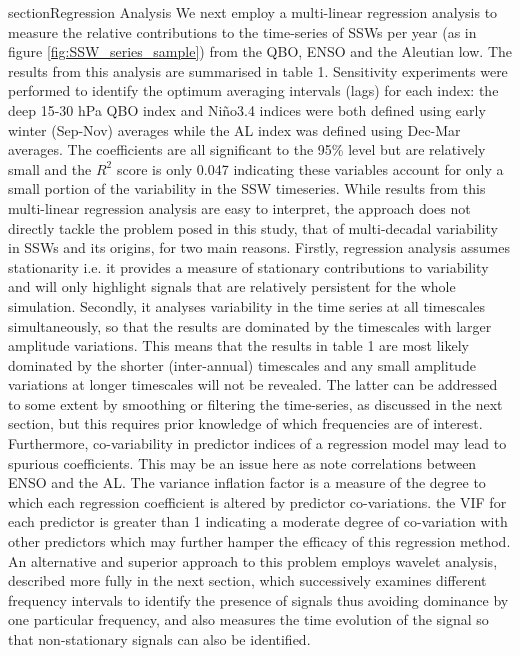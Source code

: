 section{Regression Analysis}
We next employ a multi-linear regression analysis to measure the relative contributions to the time-series of SSWs per year (as in figure \ref{fig:SSW_series_sample}) from the QBO, ENSO and the Aleutian low. The results from this analysis are summarised in table 1.  Sensitivity experiments were performed to identify the optimum averaging intervals (lags) for each index: the deep 15-30 hPa QBO index and Ni\~{n}o3.4 indices were both defined using early winter (Sep-Nov) averages while the AL index was defined using Dec-Mar averages. The coefficients are all significant to the 95\% level but are relatively small and the $R^2$ score is only 0.047 indicating these variables account for only a small portion of the variability in the SSW timeseries. While results from this multi-linear regression analysis are easy to interpret, the approach does not directly tackle the problem posed in this study, that of multi-decadal variability in SSWs and its origins, for two main reasons. Firstly, regression analysis assumes stationarity i.e. it provides a measure of stationary contributions to variability and will only highlight signals that are relatively persistent for the whole simulation. Secondly, it  analyses variability in the time series at all timescales simultaneously, so that the results are dominated by the timescales with larger amplitude variations.  This means that the results in table 1 are most likely dominated by the shorter (inter-annual) timescales and any small amplitude variations at longer timescales will not be revealed. The latter can be addressed to some extent by smoothing or filtering the time-series, as discussed in the next section, but this requires prior knowledge of which frequencies are of interest. Furthermore, co-variability in predictor indices of a regression model may lead to spurious coefficients. This may be an issue here as \cite{raoModulation2019} note correlations between ENSO and the AL. The variance inflation factor is a measure of the degree to which each regression coefficient is altered by predictor co-variations. the VIF for each predictor is greater than 1 indicating a moderate degree of co-variation with other predictors \citep{akinwandeVariance2015} which may further hamper the efficacy of this regression method. An alternative and superior approach to this problem employs wavelet analysis, described more fully in the next section, which successively examines different frequency intervals to identify the presence of signals thus avoiding dominance by one particular frequency, and also measures the time evolution of the signal so that non-stationary signals can also be identified. 

